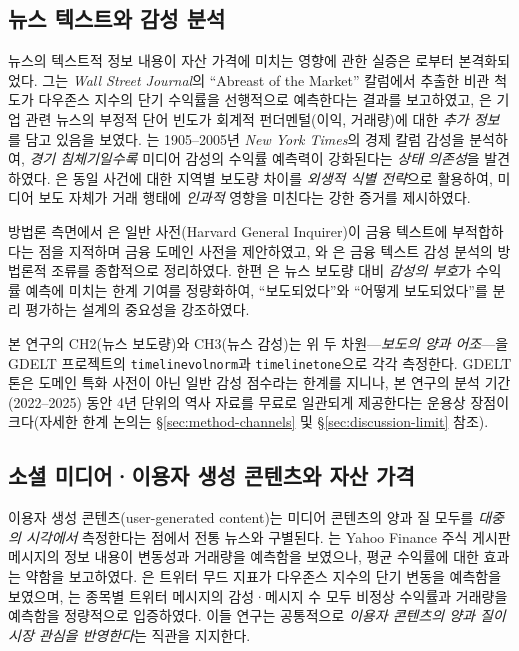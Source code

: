 \documentclass[11pt, a4paper, twocolumn]{article}
\begin{document}
\subsection{뉴스 텍스트와 감성 분석}
뉴스의 텍스트적 정보 내용이 자산 가격에 미치는 영향에 관한 실증은
\citet{tetlock2007}로부터 본격화되었다. 그는 \textit{Wall Street
Journal}의 ``Abreast of the Market'' 칼럼에서 추출한 비관 척도가
다우존스 지수의 단기 수익률을 선행적으로 예측한다는 결과를 보고하였고,
\citet{tetlocksaarmacskassy2008}은 기업 관련 뉴스의 부정적 단어 빈도가
회계적 펀더멘털(이익, 거래량)에 대한 \emph{추가 정보}를 담고 있음을
보였다. \citet{garcia2013}는 1905--2005년 \textit{New York Times}의
경제 칼럼 감성을 분석하여, \emph{경기 침체기일수록} 미디어 감성의
수익률 예측력이 강화된다는 \emph{상태 의존성}을 발견하였다.
\citet{engelbergparsons2011}은 동일 사건에 대한 지역별 보도량 차이를
\emph{외생적 식별 전략}으로 활용하여, 미디어 보도 자체가 거래 행태에
\emph{인과적} 영향을 미친다는 강한 증거를 제시하였다.

방법론 측면에서 \citet{loughranmcdonald2011}은 일반 사전(Harvard
General Inquirer)이 금융 텍스트에 부적합하다는 점을 지적하며 금융
도메인 사전을 제안하였고, \citet{kearneyliu2014}와
\citet{loughranmcdonald2016}은 금융 텍스트 감성 분석의 방법론적
조류를 종합적으로 정리하였다. 한편 \citet{hestonsinha2017}은 뉴스 보도량
대비 \emph{감성의 부호}가 수익률 예측에 미치는 한계 기여를 정량화하여,
``보도되었다''와 ``어떻게 보도되었다''를 분리 평가하는 설계의 중요성을
강조하였다.

본 연구의 CH2(뉴스 보도량)와 CH3(뉴스 감성)는 위 두 차원---\emph{보도의
양과 어조}---을 GDELT 프로젝트\citep{leetaharvardgdelt}의
\texttt{timelinevolnorm}과 \texttt{timelinetone}으로 각각 측정한다.
GDELT 톤은 도메인 특화 사전이 아닌 일반 감성 점수라는 한계를
지니나, 본 연구의 분석 기간(2022--2025) 동안 4년 단위의 역사 자료를
무료로 일관되게 제공한다는 운용상 장점이 크다(자세한 한계 논의는
\S\ref{sec:method-channels} 및 \S\ref{sec:discussion-limit} 참조).

\subsection{소셜 미디어·이용자 생성 콘텐츠와 자산 가격}
이용자 생성 콘텐츠(user-generated content)는 미디어 콘텐츠의 양과
질 모두를 \emph{대중의 시각에서} 측정한다는 점에서 전통 뉴스와
구별된다. \citet{antweilerfrank2004}는 Yahoo Finance 주식 게시판
메시지의 정보 내용이 변동성과 거래량을 예측함을 보였으나, 평균
수익률에 대한 효과는 약함을 보고하였다. \citet{bollenmaozeng2011}은
트위터 무드 지표가 다우존스 지수의 단기 변동을 예측함을 보였으며,
\citet{sprengeretal2014}는 종목별 트위터 메시지의 감성·메시지 수
모두 비정상 수익률과 거래량을 예측함을 정량적으로 입증하였다.
이들 연구는 공통적으로 \emph{이용자 콘텐츠의 양과 질이 시장 관심을
반영한다}는 직관을 지지한다.
\end{document}
